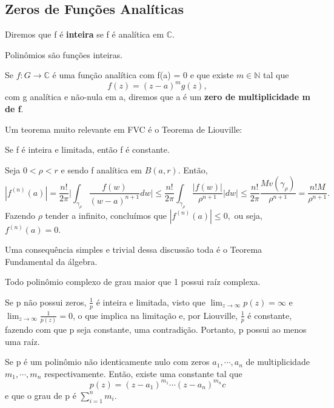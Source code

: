\documentclass[complex.tex]{subfiles}
\begin{document}
\subsection{Zeros de Funções Analíticas}
\begin{def*}
	Diremos que f é \textbf{inteira} se f é analítica em $\mathbb{C}$.
\end{def*}
\begin{example}
	Polin\^omios são funções inteiras.
\end{example}
\begin{def*}
	Se $f:G\rightarrow \mathbb{C}$ é uma função analítica com f(a) = 0 e que existe $m\in \mathbb{N}$ tal que
	$$
		f(z) = (z-a)^{m}g(z),
	$$
	com g analítica e não-nula em a, diremos que a é um \textbf{zero de multiplicidade m de f}.
\end{def*}
Um teorema muito relevante em FVC é o Teorema de Liouville:
\begin{theorem*}
	Se f é inteira e limitada, então f é constante.
\end{theorem*}
\begin{proof*}
	Seja $0 < \rho < r$ e sendo f analítica em $B(a, r)$. Então,
	$$
		|f^{(n)}(a)| = \frac{n!}{2 \pi}\biggl|\int_{\gamma_{\rho}}^{}\frac{f(w)}{(w-a)^{n+1}}dw\biggr|
		\leq \frac{n!}{2\pi}\int_{\gamma_{\rho}}^{}\frac{|f(w)|}{\rho^{n+1}}|dw| \leq \frac{n!}{2\pi}\frac{Mv(\gamma_{\rho})}{\rho^{n+1}} = \frac{n!M}{\rho^{n+1}}.
	$$
	Fazendo $\rho$ tender a infinito, concluímos que $|f^{(n)}(a)|\leq0,$ ou seja, $f^{(n)}(a) = 0.$
\end{proof*}
Uma consequência simples e trivial dessa discussão toda é o Teorema Fundamental da álgebra.
\begin{theorem*}
	Todo polin\^omio complexo de grau maior que 1 possui raíz complexa.
\end{theorem*}
\begin{proof*}
	Se p não possui zeros, $\frac{1}{p}$ é inteira e limitada, visto que $\lim_{z\to\infty}p(z) = \infty$ e $\lim_{z\to\infty}\frac{1}{p(z)} = 0$,
	o que implica na limitação e, por Liouville, $\frac{1}{p}$ é constante, fazendo com que p seja constante, uma contradição.
	Portanto, p possui ao menos uma raíz. \qedsymbol
\end{proof*}
\begin{crl*}
	Se p é um polin\^omio não identicamente nulo com zeros $a_1, \cdots, a_{n}$ de multiplicidade $m_1, \cdots, m_{n}$ respectivamente. Então,
	existe uma constante tal que
	$$
		p(z) = (z-a_1)^{m_1}\cdots(z-a_{n})^{m_{n}}c
	$$
	e que o grau de p é $\sum\limits_{i=1}^{n}m_{i}$.
\end{crl*}
\end{document}
